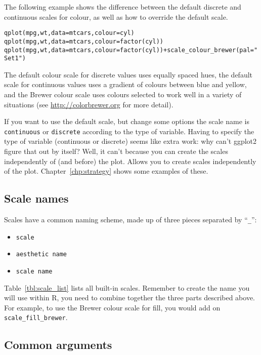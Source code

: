 The following example shows the difference between the default discrete and continuous scales for colour, as well as how to override the default scale.

\begin{alltt}
  qplot(mpg, wt, data=mtcars, colour=cyl)
  qplot(mpg, wt, data=mtcars, colour=factor(cyl))
  qplot(mpg, wt, data=mtcars, colour=factor(cyl)) + scale_colour_brewer(pal="Set1")
\end{alltt}

The default colour scale for discrete values uses equally spaced hues, the default scale for continuous values uses a gradient of colours between blue and yellow, and the Brewer colour scale uses colours selected to work well in a variety of situations (see \url{http://colorbrewer.org} for more detail).

If you want to use the default scale, but change some options the scale name is {\tt continuous} or {\tt discrete} according to the type of variable.  Having to specify the type of variable (continuous or discrete) seems like extra work: why can't ggplot2 figure that out by itself?  Well, it can't because you can create the scales independently of (and before) the plot.  Allows you to create scales independently of the plot.  Chapter~\ref{chp:strategy} shows some examples of these.


\subsection{Scale names}
\label{sub:scale_names}

Scales have a common naming scheme, made up of three pieces separated by ``{\tt \_}'':

\begin{itemize}
  \item {\tt scale}
  \item {\tt aesthetic name}
  \item {\tt scale name}
\end{itemize}

Table~\ref{tbl:scale_list} lists all built-in scales.  Remember to create the name you will use within R, you need to combine together the three parts described above.  For example, to use the Brewer colour scale for fill, you would add on {\tt scale\_fill\_brewer}.  



\subsection{Common arguments}
\label{sub:scale_arguments}

